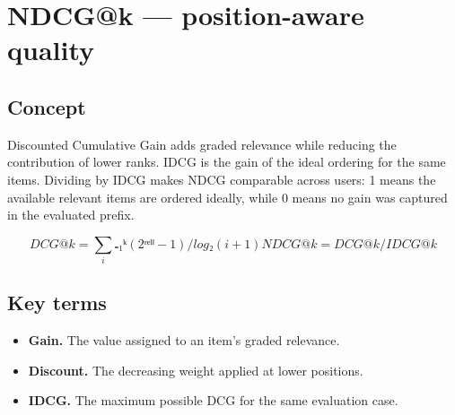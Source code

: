 \section{NDCG@k — position-aware quality}

\begin{abstract}
NDCG rewards relevant items most when they appear near the top.
\end{abstract}

\subsection{Concept}
Discounted Cumulative Gain adds graded relevance while reducing the contribution of lower ranks. IDCG is the gain of the ideal ordering for the same items. Dividing by IDCG makes NDCG comparable across users: 1 means the available relevant items are ordered ideally, while 0 means no gain was captured in the evaluated prefix.

\begin{equation*}
DCG@k = \sum_i₌₁ᵏ (2ʳᵉˡⁱ - 1) / log₂(i + 1)      NDCG@k = DCG@k / IDCG@k
\end{equation*}

\subsection{Key terms}
\begin{itemize}
\item \textbf{Gain.} The value assigned to an item’s graded relevance.
\item \textbf{Discount.} The decreasing weight applied at lower positions.
\item \textbf{IDCG.} The maximum possible DCG for the same evaluation case.
\end{itemize}

